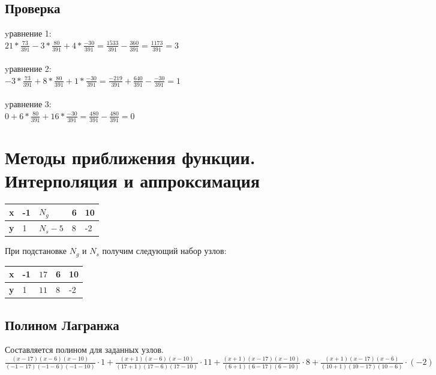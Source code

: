 \documentclass{article}
\begin{document}
\subsection{Проверка}
yравнение 1:\\
$21 * \frac{73}{391} -3*\frac{80}{391} + 4 * \frac{-30}{391}
= \frac{1533}{391} - \frac{360}{391}
= \frac{1173}{391} 
= 3$
\\\\
yравнение 2:\\
$ -3 * \frac{73}{391} + 8*\frac{80}{391} + 1 *\frac{-30}{391}
= \frac{-219}{391} + \frac{640}{391} - \frac{-30}{391}
= 1$
\\\\
yравнение 3:\\
$0 + 6*\frac{80}{391} + 16 *\frac{-30}{391}
= \frac{480}{391} -\frac{480}{391} 
= 0$

\section{Методы приближения функции. Интерполяция и аппроксимация}

\begin{table}[!h]
  \begin{tabular}{|l|l|l|l|l|}
  \hline
  \bfseries x & -1 & $N_{g}$   & 6 & 10\\
  \hline
  \bfseries y &  1 & $N_{s}-5$ & 8 & -2\\
  \hline
  \end{tabular}
\end{table}
При подстановке $N_{g}$ и $N_{s}$ получим следующий набор узлов:
\begin{table}[!h]
  \begin{tabular}{|l|l|l|l|l|}
  \hline
  \bfseries x & -1 & $17$ & 6 & 10\\
  \hline
  \bfseries y &  1 & $11$ & 8 & -2\\
  \hline
  \end{tabular}
\end{table}
 
\subsection{Полином Лагранжа}
Составляется полином для заданных узлов.\\
\begin{math}
  \frac{(x-17)(x-6)(x-10)}{(-1-17)(-1-6)(-1-10)} \cdot 1 +
  \frac{(x+1)(x-6)(x-10)}{(17+1)(17-6)(17-10)} \cdot 11 +
  \frac{(x+1)(x-17)(x-10)}{(6+1)(6-17)(6-10)} \cdot 8 + 
  \frac{(x+1)(x-17)(x-6)}{(10+1)(10-17)(10-6)} \cdot (-2)
\end{math}\\
\end{document}
